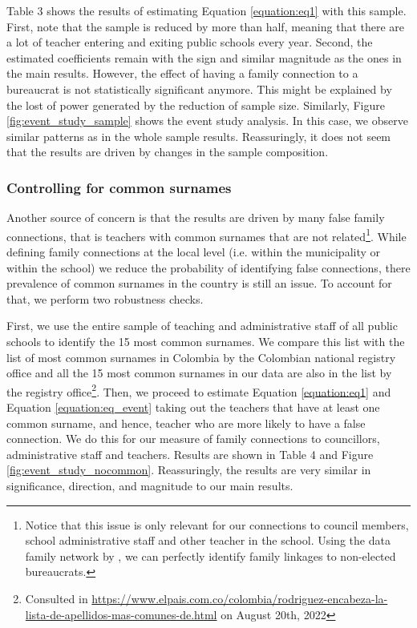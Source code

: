 \documentclass[12pt,runningheads]{article}
\begin{document}
Table 3 shows the results of estimating Equation \ref{equation:eq1} with this sample. First, note that the sample is reduced by more than half, meaning that there are a lot of teacher entering and exiting public schools every year. Second, 
the estimated coefficients remain with the sign and similar magnitude as the ones in the main results. However, the effect of having a family connection to a bureaucrat is not statistically significant anymore. This might be explained by the lost of power generated by the reduction of sample size. Similarly, Figure \ref{fig:event_study_sample} shows the event study analysis. In this case, we observe similar patterns as in the whole sample results. Reassuringly, it does not seem that the results are driven by changes in the sample composition.

\subsubsection{Controlling for common surnames}

Another source of concern is that the results are driven by many false family connections, that is teachers with common surnames that are not related\footnote{Notice that this issue is only relevant for our connections to council members, school administrative staff and other teacher in the school. Using the data family network by \cite{Riano2021}, we can perfectly identify family linkages to non-elected bureaucrats.}. While defining family connections at the local level (i.e. within the municipality or within the school) we reduce the probability of identifying false connections, there prevalence of common surnames in the country is still an issue. To account for that, we perform two robustness checks.

First, we use the entire sample of teaching and administrative staff of all public schools to identify the 15 most common surnames. We compare this list with the list of most common surnames in Colombia by the Colombian national registry office and all the 15 most common surnames in our data are also in the list by the registry office\footnote{Consulted in \url{https://www.elpais.com.co/colombia/rodriguez-encabeza-la-lista-de-apellidos-mas-comunes-de.html} on August 20th, 2022}. Then, we proceed to estimate Equation \ref{equation:eq1} and Equation \ref{equation:eq_event} taking out the teachers that have at least one common surname, and hence, teacher who are more likely to have a false connection. We do this for our measure of family connections to councillors, administrative staff and teachers. Results are shown in Table 4 and Figure \ref{fig:event_study_nocommon}. Reassuringly, the results are very similar in significance, direction, and magnitude to our main results.
\end{document}
